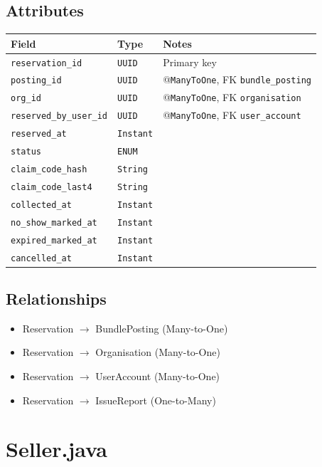 \documentclass[a4paper,11pt]{article}
\begin{document}
\subsection*{Attributes}
\begin{longtable}{|p{4cm}|p{3cm}|p{6cm}|}
\hline
\textbf{Field} & \textbf{Type} & \textbf{Notes} \\
\hline
\texttt{reservation\_id} & \texttt{UUID} & Primary key \\
\texttt{posting\_id} & \texttt{UUID} & @\texttt{ManyToOne}, FK \texttt{bundle\_posting} \\
\texttt{org\_id} & \texttt{UUID} & @\texttt{ManyToOne}, FK \texttt{organisation} \\
\texttt{reserved\_by\_user\_id} & \texttt{UUID} & @\texttt{ManyToOne}, FK \texttt{user\_account} \\
\texttt{reserved\_at} & \texttt{Instant} & \\
\texttt{status} & \texttt{ENUM} &  \\
\texttt{claim\_code\_hash} & \texttt{String} &  \\
\texttt{claim\_code\_last4} & \texttt{String} & \\
\texttt{collected\_at} & \texttt{Instant} &  \\
\texttt{no\_show\_marked\_at} & \texttt{Instant} & \\
\texttt{expired\_marked\_at} & \texttt{Instant} & \\
\texttt{cancelled\_at} & \texttt{Instant} &  \\
\hline
\end{longtable}

\subsection*{Relationships}
\begin{itemize}
  \item Reservation $\rightarrow$ BundlePosting (Many-to-One)
  \item Reservation $\rightarrow$ Organisation (Many-to-One)
  \item Reservation $\rightarrow$ UserAccount (Many-to-One)
  \item Reservation $\rightarrow$ IssueReport (One-to-Many)

\end{itemize}


\section{Seller.java}
\end{document}
